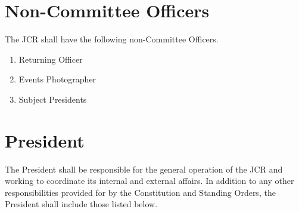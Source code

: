 \section{Non-Committee Officers}
\npara The JCR shall have the following non-Committee Officers.
\begin{enumerate}
	\item Returning Officer
	\item Events Photographer
	\item Subject Presidents
\end{enumerate}
\section{President}
\npara The President shall be responsible for the general operation of the JCR and working to coordinate its internal and external affairs. 
\npara In addition to any other responsibilities provided for by the Constitution and Standing Orders, the President shall include those listed below.
